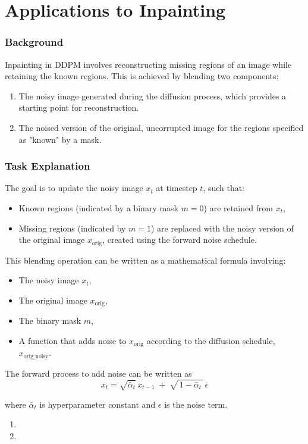 \section{Applications to Inpainting}

\subsubsection*{Background}
Inpainting in DDPM involves reconstructing missing regions of an image while retaining the known regions. This is achieved by blending two components:
\begin{enumerate}
    \item The noisy image generated during the diffusion process, which provides a starting point for reconstruction.
    \item The noised version of the original, uncorrupted image for the regions specified as "known" by a mask.
\end{enumerate}

\subsubsection*{Task Explanation}
The goal is to update the noisy image $x_t$ at timestep $t$, such that:
\begin{itemize}
    \item Known regions (indicated by a binary mask $m = 0$) are retained from $x_t$,
    \item Missing regions (indicated by \( m = 1 \)) are replaced with the noisy version of the original image $x_{\text{orig}}$, 
    created using the forward noise schedule.
\end{itemize}

This blending operation can be written as a mathematical formula involving:
\begin{itemize}
    \item The noisy image $x_t$,
    \item The original image $x_{\text{orig}}$,
    \item The binary mask $m$,
    \item A function that adds noise to $x_{\text{orig}}$ according to the diffusion schedule, $x_{\text{orig\_noisy}}$.
\end{itemize}

The forward process to add noise can be written as
\[
        x_t = \sqrt{\bar{\alpha}_t}\, x_{t-1} \;+\; \sqrt{\,1 - \bar{\alpha}_t\,}\,\epsilon
\]

where $\bar{\alpha}_t$ is hyperparameter constant and $\epsilon$ is the noise term.

\begin{enumerate}[label=(\alph*)]
    \item 

    \item 
\end{enumerate}